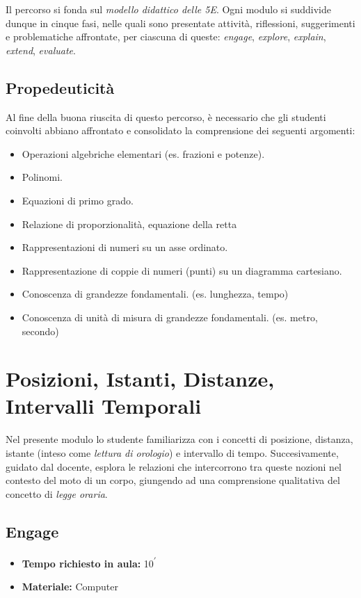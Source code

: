 \documentclass{report} \usepackage[T1]{fontenc} \usepackage[italian]{babel}
\begin{document}
Il percorso si fonda sul \emph{modello didattico delle 5E}\cite{bybee2006bscs}.
Ogni modulo si suddivide dunque in cinque fasi, nelle quali sono presentate
attività, riflessioni, suggerimenti e problematiche affrontate, per ciascuna
di queste: \emph{engage}, \emph{explore}, \emph{explain}, \emph{extend},
\emph{evaluate}.

\section{Propedeuticità}
Al fine della buona riuscita di questo percorso, è necessario che gli
studenti coinvolti abbiano affrontato e consolidato la comprensione
dei seguenti argomenti:
\begin{itemize}
\item Operazioni algebriche elementari (es. frazioni e potenze).
\item Polinomi.
\item Equazioni di primo grado.
\item Relazione di proporzionalità, equazione della retta
\item Rappresentazioni di numeri su un asse ordinato.
\item Rappresentazione di coppie di numeri (punti) su un diagramma
      cartesiano.
\item Conoscenza di grandezze fondamentali.
      (es. lunghezza, tempo)
\item Conoscenza di unità di misura di grandezze fondamentali.
      (es. metro, secondo)
\end{itemize}

\chapter{Posizioni, Istanti, Distanze, Intervalli Temporali} \label{posizioni_istanti}
Nel presente modulo lo studente familiarizza con i concetti
di posizione, distanza, istante (inteso come
\emph{lettura di orologio}) e intervallo di tempo.
Succesivamente, guidato dal docente, esplora le relazioni
che intercorrono tra queste nozioni nel contesto del moto di
un corpo, giungendo ad una comprensione qualitativa del
concetto di \emph{legge oraria}.

\section{Engage}
\begin{itemize}
\item \textbf{Tempo richiesto in aula:} 10\textsuperscript{$\prime$}
\item \textbf{Materiale:} Computer
\end{itemize}
\end{document}
